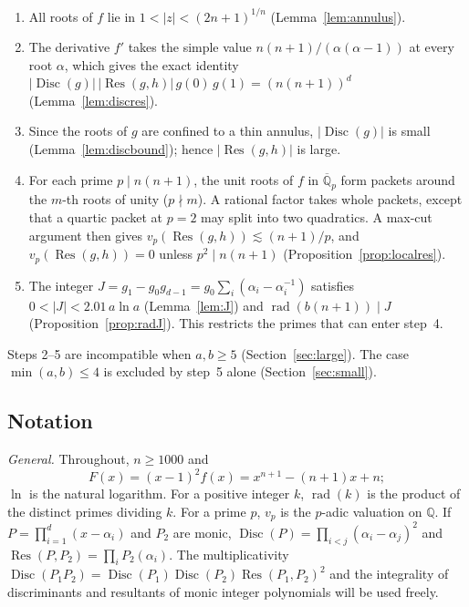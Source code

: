\documentclass[11pt]{amsart}
\theoremstyle{definition}
\theoremstyle{remark}
\numberwithin{equation}{section}
\newcommand{\Q}{\mathbb{Q}}
\newcommand{\Disc}{\operatorname{Disc}}
\newcommand{\Res}{\operatorname{Res}}
\newcommand{\rad}{\operatorname{rad}}
\begin{document}
\begin{enumerate}
\item All roots of $f$ lie in $1<|z|<(2n+1)^{1/n}$ (Lemma~\ref{lem:annulus}).
\item The derivative $f'$ takes the simple value $n(n+1)/(\alpha(\alpha-1))$ at
 every root $\alpha$, which gives the exact identity
 $|\Disc(g)|\,|\Res(g,h)|\,g(0)\,g(1)=(n(n+1))^d$ (Lemma~\ref{lem:discres}).
\item Since the roots of $g$ are confined to a thin annulus, $|\Disc(g)|$
 is small (Lemma~\ref{lem:discbound}); hence $|\Res(g,h)|$ is large.
\item For each prime $p\mid n(n+1)$, the unit roots of $f$ in
 $\overline{\Q}_p$ form packets around the $m$-th roots of unity ($p\nmid m$).
 A rational factor takes whole packets, except that a quartic packet at
 $p=2$ may split into two quadratics. A max-cut argument then gives
 $v_p(\Res(g,h))\lesssim (n+1)/p$, and $v_p(\Res(g,h))=0$ unless
 $p^2\mid n(n+1)$ (Proposition~\ref{prop:localres}).
\item The integer $J=g_1-g_0g_{d-1}=g_0\sum_i(\alpha_i-\alpha_i^{-1})$
 satisfies $0<|J|<2.01\,a\ln a$ (Lemma~\ref{lem:J}) and
 $\rad(b(n+1))\mid J$ (Proposition~\ref{prop:radJ}). This restricts the primes
 that can enter step~4.
\end{enumerate}
Steps 2--5 are incompatible when $a,b\ge5$ (Section~\ref{sec:large}).
The case $\min(a,b)\le4$ is excluded by step~5 alone
(Section~\ref{sec:small}).

\subsection*{Notation}\label{ssec:notation}
\emph{General.} Throughout, $n\ge1000$ and
\[
 F(x)=(x-1)^2f(x)=x^{n+1}-(n+1)x+n ;
\]
$\ln$ is the natural logarithm. For a positive integer $k$, $\rad(k)$ is the
product of the distinct primes dividing $k$. For a prime $p$, $v_p$ is the
$p$-adic valuation on $\Q$. If $P=\prod_{i=1}^d(x-\alpha_i)$ and $P_2$ are
monic, $\Disc(P)=\prod_{i<j}(\alpha_i-\alpha_j)^2$ and
$\Res(P,P_2)=\prod_iP_2(\alpha_i)$. The multiplicativity
$\Disc(P_1P_2)=\Disc(P_1)\Disc(P_2)\Res(P_1,P_2)^2$ and the integrality of
discriminants and resultants of monic integer polynomials will be used
freely.
\end{document}
